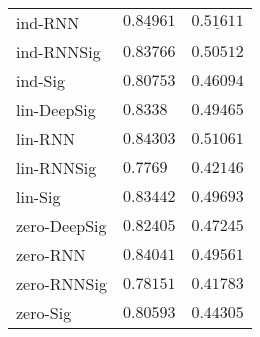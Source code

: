 \begin{tabular}{lll}
ind-RNN          &  $  \mathbf{ \underline{ 0.84961 }} $ &            $  \underline{ 0.51611 } $ \\
ind-RNNSig       &                           $ 0.83766 $ &                           $ 0.50512 $ \\
ind-Sig          &                           $ 0.80753 $ &                           $ 0.46094 $ \\
lin-DeepSig      &                            $ 0.8338 $ &                           $ 0.49465 $ \\
lin-RNN          &                           $ 0.84303 $ &                           $ 0.51061 $ \\
lin-RNNSig       &                            $ 0.7769 $ &                           $ 0.42146 $ \\
lin-Sig          &                           $ 0.83442 $ &                           $ 0.49693 $ \\
zero-DeepSig     &                           $ 0.82405 $ &                           $ 0.47245 $ \\
zero-RNN         &                           $ 0.84041 $ &                           $ 0.49561 $ \\
zero-RNNSig      &                           $ 0.78151 $ &                           $ 0.41783 $ \\
zero-Sig         &                           $ 0.80593 $ &                           $ 0.44305 $ \\
\bottomrule
\end{tabular}
